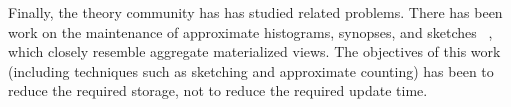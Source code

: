 
Finally, the theory community has has studied related problems.
There has been work on the maintenance of approximate histograms, synopses, and sketches ~\cite{gibbons1997fast, DBLP:journals/ftdb/CormodeGHJ12}, which closely resemble aggregate materialized views.
The objectives of this work (including techniques such as sketching and approximate counting) has been to reduce the required storage, not to reduce the required update time.
\vspace{-1em}
